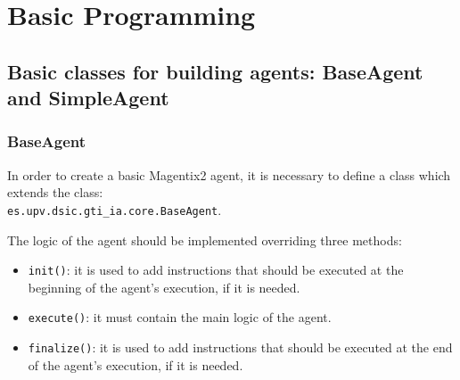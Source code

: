 \chapter{Basic Programming} \label{chap:programmingAgents}
%



\section{Basic classes for building agents: BaseAgent and SimpleAgent}

\subsection{BaseAgent}\label{sec:BaseAgent}

In order to create a basic Magentix2 agent, it is necessary to define a class which extends the class:\\ \lstinline|es.upv.dsic.gti_ia.core.BaseAgent|.

The logic of the agent should be implemented overriding three methods:
\begin{itemize}
\item \lstinline|init()|: it is used to add instructions that should be executed at the  beginning of the agent's execution, if it is needed.
\item \lstinline|execute()|: it must contain the main logic of the agent.
\item \lstinline|finalize()|: it is used to add instructions that should be executed at the  end of the agent's execution, if it is needed.
\end{itemize}


